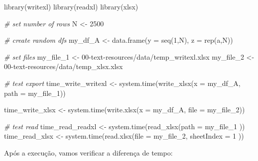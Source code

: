 \documentclass[
  11pt,
]{book}
\newenvironment{Shaded}{\begin{snugshade}}{\end{snugshade}}
\newcommand{\AttributeTok}[1]{\textcolor[rgb]{0.61,0.61,0.61}{#1}}
\newcommand{\CommentTok}[1]{\textcolor[rgb]{0.37,0.37,0.37}{\textit{#1}}}
\newcommand{\DecValTok}[1]{\textcolor[rgb]{0.06,0.06,0.06}{#1}}
\newcommand{\FunctionTok}[1]{\textcolor[rgb]{0,0,0}{#1}}
\newcommand{\NormalTok}[1]{#1}
\newcommand{\OtherTok}[1]{\textcolor[rgb]{0.37,0.37,0.37}{#1}}
\newcommand{\StringTok}[1]{\textcolor[rgb]{0.5,0.5,0.5}{#1}}
\begin{document}
\begin{Shaded}
\begin{Highlighting}[]
\FunctionTok{library}\NormalTok{(writexl)}
\FunctionTok{library}\NormalTok{(readxl)}
\FunctionTok{library}\NormalTok{(xlsx)}

\CommentTok{\# set number of rows}
\NormalTok{N }\OtherTok{\textless{}{-}} \DecValTok{2500}

\CommentTok{\# create random dfs}
\NormalTok{my\_df\_A }\OtherTok{\textless{}{-}} \FunctionTok{data.frame}\NormalTok{(}\AttributeTok{y =} \FunctionTok{seq}\NormalTok{(}\DecValTok{1}\NormalTok{,N),}
                      \AttributeTok{z =} \FunctionTok{rep}\NormalTok{(}\StringTok{\textquotesingle{}a\textquotesingle{}}\NormalTok{,N))}

\CommentTok{\# set files}
\NormalTok{my\_file\_1 }\OtherTok{\textless{}{-}} \StringTok{\textquotesingle{}00{-}text{-}resources/data/temp\_writexl.xlsx\textquotesingle{}}
\NormalTok{my\_file\_2 }\OtherTok{\textless{}{-}} \StringTok{\textquotesingle{}00{-}text{-}resources/data/temp\_xlsx.xlsx\textquotesingle{}}

\CommentTok{\# test export}
\NormalTok{time\_write\_writexl }\OtherTok{\textless{}{-}} \FunctionTok{system.time}\NormalTok{(}\FunctionTok{write\_xlsx}\NormalTok{(}\AttributeTok{x =}\NormalTok{ my\_df\_A,}
                                             \AttributeTok{path =}\NormalTok{ my\_file\_1))}

\NormalTok{time\_write\_xlsx }\OtherTok{\textless{}{-}} \FunctionTok{system.time}\NormalTok{(}\FunctionTok{write.xlsx}\NormalTok{(}\AttributeTok{x =}\NormalTok{ my\_df\_A,}
                                          \AttributeTok{file =}\NormalTok{ my\_file\_2))}

\CommentTok{\# test read}
\NormalTok{time\_read\_readxl }\OtherTok{\textless{}{-}} \FunctionTok{system.time}\NormalTok{(}\FunctionTok{read\_xlsx}\NormalTok{(}\AttributeTok{path =}\NormalTok{ my\_file\_1 ))}
\NormalTok{time\_read\_xlsx }\OtherTok{\textless{}{-}} \FunctionTok{system.time}\NormalTok{(}\FunctionTok{read.xlsx}\NormalTok{(}\AttributeTok{file =}\NormalTok{ my\_file\_2,}
                                        \AttributeTok{sheetIndex =} \DecValTok{1}\NormalTok{ ))}
\end{Highlighting}
\end{Shaded}

Após a execução, vamos verificar a diferença de tempo:
\end{document}
